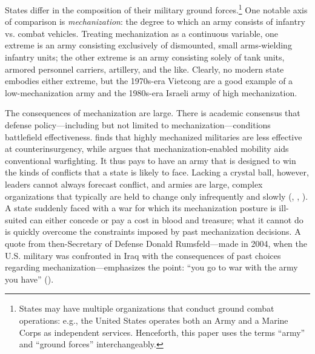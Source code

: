 \documentclass{article}
\begin{document}
States differ in the composition of their military ground forces.\footnote{States may have multiple organizations that
conduct ground combat operations: e.g., the United States operates both an Army
and a Marine Corps as independent services. Henceforth, this paper uses the
terms ``army'' and ``ground forces'' interchangeably.} One notable axis of comparison 
is \textit{mechanization}: the degree to which an army consists of infantry 
vs. combat vehicles. Treating mechanization as a continuous variable, 
one extreme is an army consisting exclusively of dismounted, small 
arms-wielding infantry units; the other extreme is an army consisting 
solely of tank units, armored personnel carriers, artillery, and the like.
Clearly, no modern state embodies either extreme, but the 1970s-era Vietcong are
a good example of a low-mechanization army and the 1980s-era Israeli army of
high mechanization.

The consequences of mechanization are large. There is
academic consensus that defense policy---including but not limited to
mechanization---conditions battlefield effectiveness. 
\cite{lyall2009rage} finds that highly mechanized militaries are less effective
at counterinsurgency, while \cite{biddle2004military} argues that
mechanization-enabled mobility aids conventional warfighting. It thus
pays to have an army that is designed to win the
kinds of
conflicts that a state is likely to face. Lacking a crystal ball, however,
leaders cannot always forecast conflict, and armies are large, complex
organizations that typically are held to change only infrequently and slowly (\cite{murray1998military},
\cite{locher2004victory}, \cite{zegart2000flawed}). A state suddenly faced with
a war for which its mechanization posture is ill-suited can either concede or
pay a cost in blood and treasure; what it cannot do is
quickly overcome the constraints imposed by past mechanization decisions. 
A quote from then-Secretary of Defense Donald Rumsfeld---made in 2004, when the U.S. military
was confronted in Iraq with the consequences of past choices regarding
mechanization---emphasizes the point:
``you go to war with the army you have'' (\cite{schmitt_2004}). 
\end{document}
